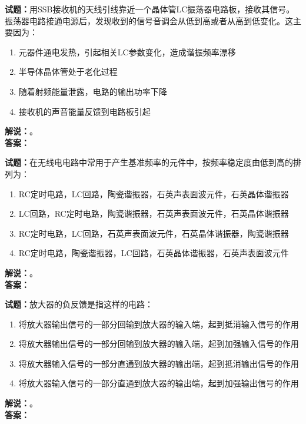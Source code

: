 \documentclass{ctexbook}
\begin{document}
\vspace{\baselineskip}

\noindent\textbf{试题：}用SSB接收机的天线引线靠近一个晶体管LC振荡器电路板，接收其信号。振荡器电路接通电源后，发现收到的信号音调会从低到高或者从高到低变化。这主要因为：
\begin{enumerate}[leftmargin=3em]
  \item 元器件通电发热，引起相关LC参数变化，造成谐振频率漂移
  \item 半导体晶体管处于老化过程
  \item 随着射频能量泄露，电路的输出功率下降
  \item 接收机的声音能量反馈到电路板引起
\end{enumerate}
\noindent\textbf{解说：}\textbf{}。\\\noindent\textbf{答案：}

\vspace{\baselineskip}

\noindent\textbf{试题：}在无线电电路中常用于产生基准频率的元件中，按频率稳定度由低到高的排列为：
\begin{enumerate}[leftmargin=3em]
  \item RC定时电路，LC回路，陶瓷谐振器，石英声表面波元件，石英晶体谐振器
  \item LC回路，RC定时电路，陶瓷谐振器，石英声表面波元件，石英晶体谐振器
  \item RC定时电路，LC回路，石英声表面波元件，石英晶体谐振器，陶瓷谐振器
  \item RC定时电路，陶瓷谐振器，LC回路，石英晶体谐振器，石英声表面波元件
\end{enumerate}
\noindent\textbf{解说：}\textbf{}。\\\noindent\textbf{答案：}

\vspace{\baselineskip}

\noindent\textbf{试题：}放大器的负反馈是指这样的电路：
\begin{enumerate}[leftmargin=3em]
  \item 将放大器输出信号的一部分回输到放大器的输入端，起到抵消输入信号的作用
  \item 将放大器输出信号的一部分回输到放大器的输入端，起到加强输入信号的作用
  \item 将放大器输入信号的一部分直通到放大器的输出端，起到抵消输出信号的作用
  \item 将放大器输入信号的一部分直通到放大器的输出端，起到加强输出信号的作用
\end{enumerate}
\noindent\textbf{解说：}\textbf{}。\\\noindent\textbf{答案：}
\end{document}
